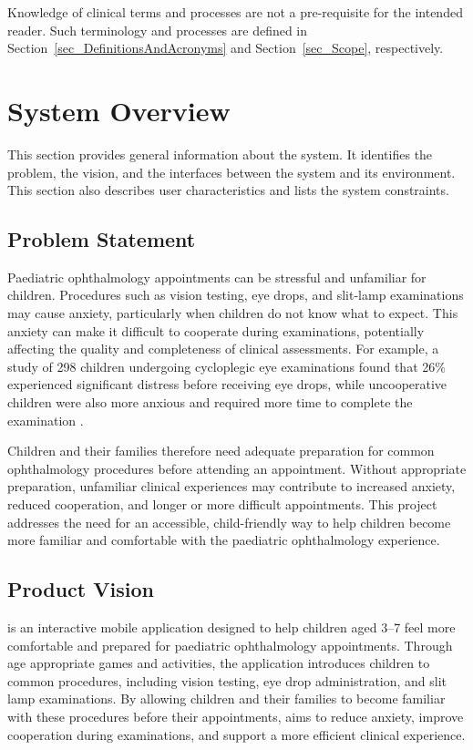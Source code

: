 \documentclass[12pt]{article}
\begin{document}
Knowledge of clinical terms and processes are not a pre-requisite for the intended reader. Such terminology and processes are defined in
Section~\ref{sec_DefinitionsAndAcronyms} and Section~\ref{sec_Scope}, respectively.

\section{System Overview}

This section provides general information about the system.  It identifies the
problem, the vision, and the interfaces between the system and its environment.
This section also describes user characteristics and lists the system
constraints.

\subsection{Problem Statement}
\label{problem-statement}

Paediatric ophthalmology appointments can be stressful and unfamiliar for children.
Procedures such as vision testing, eye drops, and slit-lamp examinations may cause anxiety, particularly when children do not know what to expect.
This anxiety can make it difficult to cooperate during examinations, potentially affecting the quality and completeness of clinical assessments.
For example, a study of 298 children undergoing cycloplegic eye examinations found that 26\% experienced significant distress before receiving eye drops,
while uncooperative children were also more anxious and required more time to complete the examination \cite{ChiaEtAl2015}.

Children and their families therefore need adequate preparation for common ophthalmology procedures before attending an appointment.
Without appropriate preparation, unfamiliar clinical experiences may contribute to increased anxiety, reduced cooperation, and longer or more difficult appointments.
This project addresses the need for an accessible, child-friendly way to help children become more familiar and comfortable with the paediatric ophthalmology experience.

\subsection{Product Vision}
\label{sec_Product_Vision}

\progname{} is an interactive mobile application designed to help
children aged 3--7 feel more comfortable and prepared for paediatric
ophthalmology appointments. Through age appropriate games and activities,
the application introduces children to common procedures, including
vision testing, eye drop administration, and slit lamp examinations.
By allowing children and their families to become familiar with these
procedures before their appointments, \progname{} aims to reduce
anxiety, improve cooperation during examinations, and support a
more efficient clinical experience.
\end{document}
